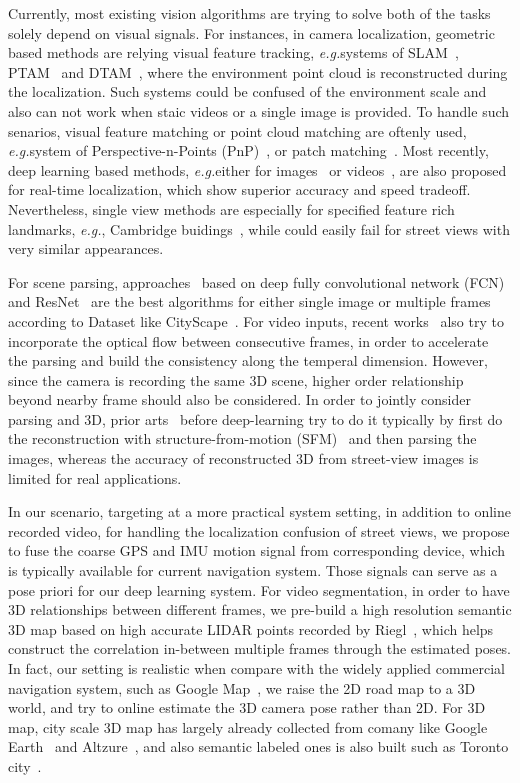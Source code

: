 \documentclass[10pt,twocolumn,letterpaper]{article}
\def\eg{\emph{e.g.}}
\begin{document}
Currently, most existing vision algorithms are trying to solve both of the tasks solely depend on visual signals. 
For instances, in camera localization, geometric based methods are relying visual feature tracking, \eg systems of SLAM~\cite{}, PTAM~\cite{} and 
DTAM~\cite{}, where the environment point cloud is reconstructed during the localization. Such systems could be confused of the environment scale and also can not work when staic videos or a single image is provided.
To handle such senarios, visual feature matching or point cloud matching are oftenly used, \eg system of Perspective-n-Points (PnP)~\cite{}, or patch matching~\cite{}. 
Most recently, deep learning based methods, \eg either for images~\cite{} or videos~\cite{}, are also proposed for real-time localization, which show superior accuracy and speed tradeoff.
Nevertheless, single view methods are especially for specified feature rich landmarks, \eg, Cambridge buidings~\cite{}, while could easily fail for street views with very similar appearances.

For scene parsing, approaches~\cite{} based on deep fully convolutional network (FCN)~\cite{} and ResNet~\cite{} are the best algorithms for either single image or multiple frames according to Dataset like CityScape~\cite{}. For video inputs, recent works~\cite{} also try to incorporate the optical flow between consecutive frames, in order to accelerate the parsing and build the consistency along the temperal dimension.
However, since the camera is recording the same 3D scene, higher order relationship beyond nearby frame should also be considered.
In order to jointly consider parsing and 3D, prior arts~\cite{} before deep-learning try to do it typically by first do the reconstruction with structure-from-motion (SFM)~\cite{} and then parsing the images, 
 whereas the accuracy of reconstructed 3D from street-view images is limited for real applications.

In our scenario, targeting at a more practical system setting, in addition to online recorded video, for handling the localization confusion of street views, we propose to fuse the coarse GPS and IMU motion signal from corresponding device, which is typically available for current navigation system. Those signals can serve as a pose priori for our deep learning system. 
For video segmentation, in order to have 3D relationships between different frames, we pre-build a high resolution semantic 3D map based on high accurate LIDAR points recorded by Riegl~\cite{}, which helps construct the correlation in-between multiple frames through the estimated poses. 
In fact, our setting is realistic when compare with the widely applied commercial navigation system, such as Google Map~\cite{}, we raise the 2D road map to a 3D world, and try to online estimate the 3D camera pose rather than 2D. For 3D map, city scale 3D map has largely already collected from comany like Google Earth~\cite{} and Altzure~\cite{}, and also semantic labeled ones is also built such as Toronto city~\cite{}.
\end{document}
